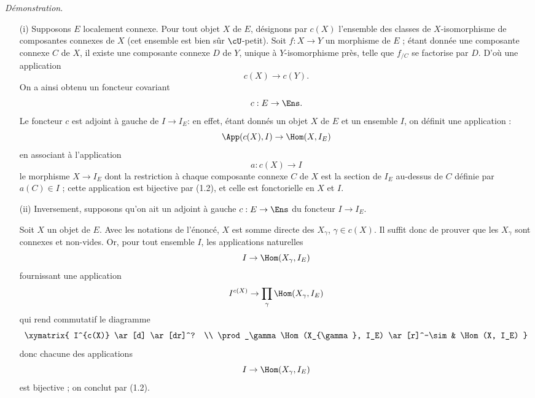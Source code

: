 {\it Démonstration}.
\begin{enumerate}
    \item[(i)] Supposons $E$ localement connexe. Pour tout objet $X$ de $E$, désignons par $c(X)$ l'ensemble des classes de $X$-isomorphisme de composantes connexes de $X$ (cet ensemble est bien sûr $\cU$-petit). Soit $f: X \to Y$ un morphisme de $E$ ; étant donnée une composante connexe $C$ de $X$, il existe une composante connexe $D$ de $Y$, unique à $Y$-isomorphisme près, telle que $f_{/C}$ se factorise par $D$. D'où une application
    $$
    c(X) \to c(Y).
    $$
    On a ainsi obtenu un foncteur covariant
    $$
    c: E \to \Ens.
    $$
    Le foncteur $c$ est adjoint à gauche de $I \to I_E$: en effet, étant donnés un objet $X$ de $E$ et un ensemble $I$, on définit une application : 
    $$
    \App(c(X), I) \to \Hom(X, I_E)
    $$
    en associant à l'application
    $$
    a: c(X) \to I
    $$
    le morphisme $X \to I_E$ dont la restriction à chaque composante connexe $C$ de $X$ est la section de $I_E$ au-dessus de $C$ définie par $a(C) \in I$ ; cette application est bijective par (1.2), et celle est fonctorielle en $X$ et $I$.
    \item[(ii)] Inversement, supposons qu'on ait un adjoint à gauche $c: E \to \Ens$ du foncteur $I \to I_E$.
    
    Soit $X$ un objet de $E$. Avec les notations de l'énoncé, $X$ est somme directe des $X_{\gamma}$, $\gamma \in c(X)$. Il suffit donc de prouver que les $X_{\gamma}$ sont connexes et non-vides. Or, pour tout ensemble $I$, les applications naturelles
    $$
    I \to \Hom(X_{\gamma}, I_E)
    $$
    fournissant une application
    $$
    I^{c(X)} \to \prod_\gamma \Hom(X_{\gamma}, I_E)
    $$
    qui rend commutatif le diagramme
    \[
        \xymatrix{
        I^{c(X)} \ar[d] \ar[dr]^? \\
        \prod_\gamma \Hom(X_{\gamma}, I_E) \ar[r]^-\sim & \Hom(X, I_E)
        }
    \]
    donc chacune des applications
    $$
    I \to \Hom(X_{\gamma}, I_E)
    $$
    est bijective ; on conclut par (1.2).
\end{enumerate}








